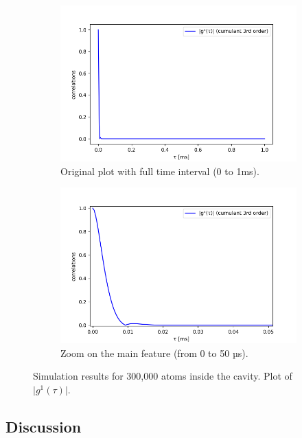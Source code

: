 \documentclass[11pt]{report}
\begin{document}
\begin{figure}[h!]
\centering
\begin{subfigure}{.48\textwidth}
  \centering
  \includegraphics[width=1\linewidth]{300k_3_g1}
  \caption{Original plot with full time interval (0 to 1ms).}
\end{subfigure}%
\hspace{1em}%
\begin{subfigure}{.48\textwidth}
  \centering
  \includegraphics[width=1\linewidth]{300k_3_g1_zoom_1}
  \caption{Zoom on the main feature (from 0 to 50 µs).}
  \label{300k_3_g1_zoom_1}
\end{subfigure}
\caption{Simulation results for 300,000 atoms inside the cavity. Plot of $\vert g^1(\tau) \vert$.}
\end{figure}

\pagebreak
\subsection{Discussion}
\end{document}
